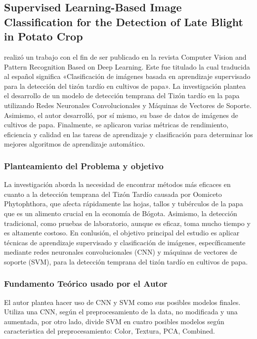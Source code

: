 \subsection{Supervised Learning-Based Image Classification for the Detection of Late Blight in Potato Crop \citep*{antecedente3}}

\citeauthor{antecedente3} realizó un trabajo con el fin de ser publicado en la revista Computer Vision and Pattern Recognition Based on Deep Learning. Este fue titulado  la cual traducida al español significa  «Clasificación de imágenes basada en aprendizaje supervisado para la detección del tizón tardío en cultivos de papa». La investigación plantea el desarrollo de un modelo de detección temprana del Tizón tardío en la papa utilizando Redes Neuronales Convolucionales y Máquinas de Vectores de Soporte. Asimismo, el autor desarrolló, por sí mismo, su base de datos de imágenes de cultivos de papa. Finalmente, se aplicaron varias métricas de rendimiento, eficiencia y calidad en las tareas de aprendizaje y clasificación para determinar los mejores algoritmos de aprendizaje automático.

\subsubsection{Planteamiento del Problema y objetivo }

La investigación aborda la necesidad de encontrar métodos más eficaces en cuanto a la detección temprana del Tizón Tardío causada por Oomiceto Phytophthora, que afecta rápidamente las hojas, tallos y tubérculos de la papa que es un alimento crucial en la economía de Bógota. Asimismo, la detección tradicional, como pruebas de laboratorio, aunque es eficaz, toma mucho tiempo y es altamente costoso. En conlusión, el objetivo principal del estudio es aplicar técnicas de aprendizaje supervisado y clasificación de imágenes, específicamente mediante redes neuronales convolucionales (CNN) y máquinas de vectores de soporte (SVM), para la detección temprana del tizón tardío en cultivos de papa.

\subsubsection{Fundamento Teórico usado por el Autor}

El autor plantea hacer uso de CNN y SVM como sus posibles modelos finales. Utiliza una CNN, según el preprocesamiento de la data, no modificada y una aumentada, por otro lado, divide SVM en cuatro posibles modelos según caracteristica del preprocesamiento: Color, Textura, PCA, Combined. 

